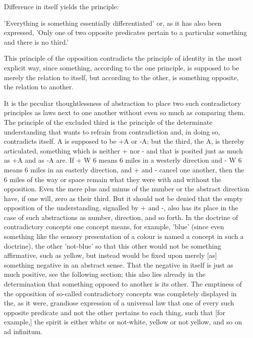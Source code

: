     Difference in itself yields the principle:

    'Everything is something essentially differentiated'
    or, as it has also been expressed,
    'Only one of two opposite predicates pertain to
    a particular something and there is no third.'

    This principle of the opposition contradicts
    the principle of identity in the most explicit way,
    since something, according to the one principle,
    is supposed to be merely the relation to itself,
    but according to the other, is something opposite,
    the relation to another.

    It is the peculiar thoughtlessness of abstraction to place
    two such contradictory principles as laws next to one another
    without even so much as comparing them.
    The principle of the excluded third is the
    principle of the determinate understanding that wants to refrain
    from contradiction and, in doing so, contradicts itself.
    A is supposed to be +A or -A;
    but the third, the A, is thereby articulated,
    something which is neither + nor - and that is posited just as much
    as +A and as -A are.
    If + W 6 means 6 miles in a westerly direction
    and - W 6 means 6 miles in an easterly direction,
    and + and - cancel one another, then the 6 miles of the way or
    space remain what they were with and without the opposition.
    Even the mere plus and minus of the number or the abstract direction
    have, if one will, zero as their third.
    But it should not be denied that the empty opposition of the understanding,
    signalled by + and -, also has its place in the case of such abstractions
    as number, direction, and so forth.
    In the doctrine of contradictory concepts one concept means, for
    example, 'blue' (since even something like the sensory presentation
    of a colour is named a concept in such a doctrine),
    the other 'not-blue' so that this other would not be something affirmative,
    such as yellow, but instead would be fixed upon merely [as]
    something negative in an abstract sense.
    That the negative in itself is just as much positive,
    see the following section; this also lies already
    in the determination that something opposed to another
    is its other.
    The emptiness of the opposition of so-called
    contradictory concepts was completely displayed in the, as it were,
    grandiose expression of a universal law that one of every such
    opposite predicate and not the other pertains to each thing, such
    that [for example,] the spirit is either white or not-white,
    yellow or not yellow, and so on ad infinitum.

